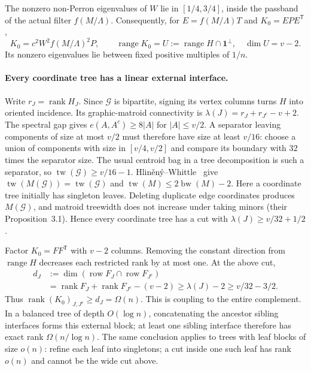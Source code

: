 \documentclass[11pt]{amsart}
\theoremstyle{definition}\newtheorem{definition}[theorem]{Definition}
\theoremstyle{remark}\newtheorem{remark}[theorem]{Remark}
\numberwithin{equation}{section}
\begin{document}
The nonzero non-Perron eigenvalues of $W$ lie in $[1/4,3/4]$, inside
the passband of the actual filter $f(M/\Lambda)$.  Consequently, for
$E=f(M/\Lambda)T$ and $K_0=EPE^{\mathsf T}$,
\begin{equation}
 K_0=c^2W^2f(M/\Lambda)^2P,\qquad
 \operatorname{range}K_0=U:=\operatorname{range}H\cap\mathbf1^\perp,
 \quad \dim U=v-2.                                \label{ifc:interface:range}
\end{equation}
Its nonzero eigenvalues lie between fixed positive multiples of $1/n$.

\paragraph{Every coordinate tree has a linear external interface.}
Write $r_J=\operatorname{rank}H_J$.  Since $\mathcal G$ is bipartite,
signing its vertex columns turns $H$ into oriented incidence.  Its
graphic-matroid connectivity is
$\lambda(J)=r_J+r_{J^c}-v+2$.
The spectral gap gives $e(A,A^c)\ge8|A|$ for $|A|\le v/2$.
A separator leaving components of size at most $v/2$ must therefore
have size at least $v/16$: choose a union of components with size in
$[v/4,v/2]$ and compare its boundary with $32$ times the separator size.
The usual centroid bag in a tree decomposition is such a separator, so
$\operatorname{tw}(\mathcal G)\ge v/16-1$.
Hlin\v en\'y--Whittle~\cite[Theorems 3.2 and 4.2]{matroidwidth}
give $\operatorname{tw}(M(\mathcal G))=\operatorname{tw}(\mathcal G)$ and
$\operatorname{tw}(M)\le2\operatorname{bw}(M)-2$.
Here a coordinate tree initially has singleton leaves. Deleting duplicate edge coordinates produces $M(\mathcal G)$, and
matroid treewidth does not increase under taking minors (their
Proposition~3.1).  Hence every coordinate tree has a cut with
$\lambda(J)\ge v/32+1/2$.

Factor $K_0=FF^{\mathsf T}$ with $v-2$ columns.  Removing the constant
direction from $\operatorname{range}H$ decreases each restricted rank
by at most one.  At the above cut,
\begin{align*}
 d_J&:=\dim(\operatorname{row}F_J\cap\operatorname{row}F_{J^c})\\
 &=\operatorname{rank}F_J+\operatorname{rank}F_{J^c}-(v-2)
   \ge\lambda(J)-2\ge v/32-3/2.
\end{align*}
Thus $\operatorname{rank}(K_0)_{J,J^c}\ge d_J=\Omega(n)$.
This is coupling to the entire complement.  In a balanced tree of
depth $O(\log n)$, concatenating the ancestor sibling interfaces
forms this external block; at least one sibling interface therefore
has exact rank $\Omega(n/\log n)$. The same conclusion applies to trees with leaf blocks of size $o(n)$: refine each leaf into singletons; a cut inside one such leaf has rank $o(n)$ and cannot be the wide cut above.
\end{document}
